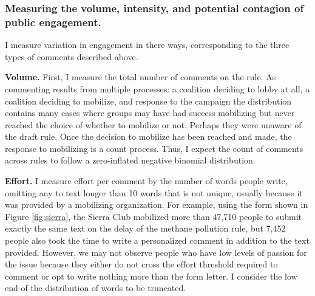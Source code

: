 
% 





\subsubsection{Measuring the volume, intensity, and potential contagion of public engagement.}

I measure variation in engagement in there ways, corresponding to the three types of comments described above. 

\textbf{Volume.} 
First, I measure the total number of comments on the rule. As commenting results from multiple processes: a coalition deciding to lobby at all, a coalition deciding to mobilize, and response to the campaign the distribution contains many cases where groups may have had success mobilizing but never reached the choice of whether to mobilize or not. Perhaps they were unaware of the draft rule. Once the decision to mobilize has been reached and made, the response to mobilizing is a count process. Thus, I expect the count of comments across rules to follow a zero-inflated negative binomial distribution. %

\textbf{Effort.} I measure effort per comment by the number of words people write, omitting any to text longer than 10 words that is not unique, usually because it was provided by a mobilizing organization. %
For example, using the form shown in Figure \ref{fig:sierra}, the Sierra Club mobilized more than 47,710 people to submit exactly the same text on the delay of the methane pollution rule, but 7,452 people also took the time to write a personalized comment in addition to the text provided. However, we may not observe people who have low levels of passion for the issue because they either do not cross the effort threshold required to comment or opt to write nothing more than the form letter. I consider the low end of the distribution of words to be truncated.

